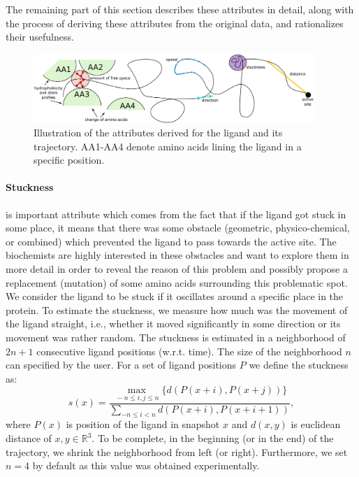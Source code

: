 \documentclass[twocolumn]{bmcart}%
\begin{document}
The remaining part of this section describes these attributes in detail, along with the process of deriving these attributes from the original data, and rationalizes their usefulness.
    
\begin{figure}[thb]
	\centering
  \includegraphics[width=0.95\textwidth]{img/attributes.png}
  \caption{\label{fig:attributes} Illustration of the attributes derived for the ligand and its trajectory. AA1-AA4 denote amino acids lining the ligand in a specific position.}
\end{figure}

\paragraph{\textbf{Stuckness}} is important attribute which comes from the fact that if the ligand got stuck in some place, it means that there was some obstacle (geometric, physico-chemical, or combined) which prevented the ligand to pass towards the active site.
The biochemists are highly interested in these obstacles and want to explore them in more detail in order to reveal the reason of this problem and possibly propose a replacement (mutation) of some amino acids surrounding this problematic spot.
We consider the ligand to be stuck if it oscillates around a specific place in the protein. %
To estimate the stuckness, we measure how much was the movement of the ligand straight, i.e., whether it moved significantly in some direction or its movement was rather random.
The stuckness is estimated in a neighborhood of $2n + 1$ consecutive ligand positions (w.r.t. time).
The size of the neighborhood $n$ can specified by the user.
For a set of ligand positions $P$ we define the stuckness as:
\begin{equation}
  s(x) = \frac{\max_{\,-n \le i, j \le n} \{ d(P(x + i), P(x + j)) \}}{\sum_{-n \le i < n}{d(P(x + i), P(x + i + 1))}},
  \label{eq:straightness}
\end{equation}
where $P(x)$ is position of the ligand in snapshot $x$ and $d(x, y)$ is euclidean distance of $x, y \in \mathbb{R}^3$.
To be complete, in the beginning (or in the end) of the trajectory, we shrink the neighborhood from left (or right).
Furthermore, we set $n = 4$ by default as this value was obtained experimentally.
\end{document}
